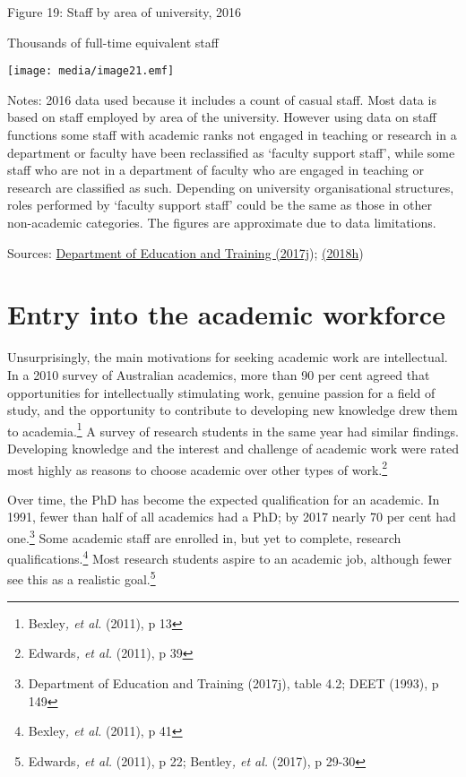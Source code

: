 \documentclass[]{book}
\begin{document}
\protect\hypertarget{_Ref518912756}{}{}Figure 19: Staff by area of university, 2016

Thousands of full-time equivalent staff

\texttt{[image: media/image21.emf]}

Notes: 2016 data used because it includes a count of casual staff. Most data is based on staff employed by area of the university. However using data on staff functions some staff with academic ranks not engaged in teaching or research in a department or faculty have been reclassified as `faculty support staff', while some staff who are not in a department of faculty who are engaged in teaching or research are classified as such. Depending on university organisational structures, roles performed by `faculty support staff' could be the same as those in other non-academic categories. The figures are approximate due to data limitations.

Sources: \protect\hyperlink{_ENREF_76}{Department of Education and Training (2017j}); \protect\hyperlink{_ENREF_87}{(2018h})

\hypertarget{entry-into-the-academic-workforce}{%
\section{Entry into the academic workforce}\label{entry-into-the-academic-workforce}}

Unsurprisingly, the main motivations for seeking academic work are intellectual. In a 2010 survey of Australian academics, more than 90 per cent agreed that opportunities for intellectually stimulating work, genuine passion for a field of study, and the opportunity to contribute to developing new knowledge drew them to academia.\footnote{Bexley\emph{, et al.} (2011), p 13} A survey of research students in the same year had similar findings. Developing knowledge and the interest and challenge of academic work were rated most highly as reasons to choose academic over other types of work.\footnote{Edwards\emph{, et al.} (2011), p 39}

Over time, the PhD has become the expected qualification for an academic. In 1991, fewer than half of all academics had a PhD; by 2017 nearly 70 per cent had one.\footnote{Department of Education and Training (2017j), table 4.2; DEET (1993), p 149} Some academic staff are enrolled in, but yet to complete, research qualifications.\footnote{Bexley\emph{, et al.} (2011), p 41} Most research students aspire to an academic job, although fewer see this as a realistic goal.\footnote{Edwards\emph{, et al.} (2011), p 22; Bentley\emph{, et al.} (2017), p 29-30}
\end{document}
